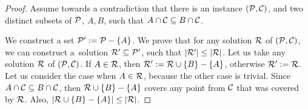 \begin{proof}
Assume towards a contradiction that there is an instance  $(\mathcal{P}, \mathcal{C})$,
and two distinct subsets of $\mathcal{P}$,
$A, B$, such that $A \cap \mathcal{C} \subseteq B \cap \mathcal{C}$.

We construct a set $\mathcal{P}' := \mathcal{P} - \{A\}$.
We prove that for any solution $\mathcal{R}$ of $(\mathcal{P}, \mathcal{C})$,
we can construct a~solution $\mathcal{R}' \subseteq \mathcal{P}'$,
such that $|\mathcal{R}'| \le |\mathcal{R}|$.
Let us take any solution $\mathcal{R}$ of $(\mathcal{P}, \mathcal{C})$.
If $A \in \mathcal{R}$, then $\mathcal{R}' := \mathcal{R} \cup \{B\} - \{A\}$,
otherwise $\mathcal{R}' := \mathcal{R}$.
Let us consider the case when $A \in \mathcal{R}$,
because the other case is trivial.
Since $A \cap \mathcal{C} \subseteq B \cap \mathcal{C}$,
then $\mathcal{R} \cup \{B\} - \{A\}$
covers any point from $\mathcal{C}$ that was covered by $\mathcal{R}$.
Also, $|\mathcal{R} \cup \{B\} - \{A\}| \le |\mathcal{R}|$.
\end{proof}

